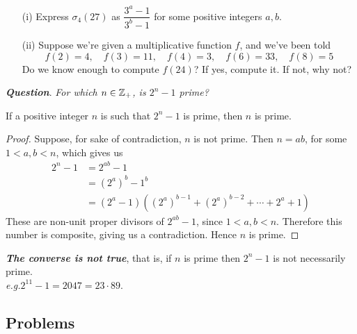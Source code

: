 
\begin{example}[in-class]
\hfill
\begin{itemize}
\item[(i)] Express $\sigma_4(27)$ as $\dfrac{3^a - 1}{3^b - 1}$ for some positive integers $a,b$.
\item[(ii)] Suppose we're given a multiplicative function $f$, and we've been told 
\[f(2) = 4,\quad f(3) = 11,\quad f(4) = 3,\quad f(6) = 33,\quad f(8) = 5\]
Do we know enough to compute $f(24)$? If yes, compute it. If not, why not?
\end{itemize}
\end{example}

\vspace*{2em}

\emph{\textbf{Question}}. \textit{For which $n \in \mathbb Z_+$, is $2^n - 1$ prime?}

\vspace*{1em}

\begin{proposition}\label{mersprime}
If a positive integer $n$ is such that $2^n - 1$ is prime, then $n$ is prime.
\end{proposition}
\begin{proof}
Suppose, for sake of contradiction, $n$ is not prime. Then $n = ab$, for some $1<a,b<n$, which gives us
\begin{align*}
2^n - 1 &= 2^{ab}-1\\[0.5em]
&= (2^a)^b - 1^b\\[0.5em]
&= (2^a - 1)((2^a)^{b-1}+(2^a)^{b-2}+\cdots+2^a+1)
\end{align*}
These are non-unit proper divisors of $2^{ab} - 1$, since $1<a,b<n$. Therefore this number is composite, giving us a contradiction. Hence $n$ is prime.
\end{proof}


\emph{\textbf{The converse is not true}}, that is, if $n$ is prime then $2^n - 1$ is not necessarily prime.
\vspace*{0.5em}\\
\emph{e.g.}\quad $2^{11} - 1 = 2047 = 23\cdot 89$.

\vspace*{0.5in}

\subsection{Problems}
\vspace{0.1in}

